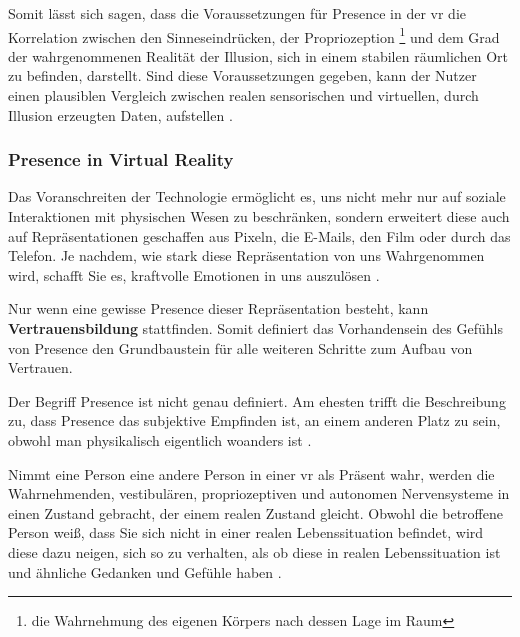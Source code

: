 \documentclass[a4paper,11pt]{article}%
\renewcommand{\\}{\vspace*{0.5\baselineskip} \newline}
\begin{document}
Somit lässt sich sagen, dass die Voraussetzungen für \dq Presence\dq{} in der \ac{vr} die Korrelation zwischen den Sinneseindrücken, der Propriozeption \footnote{die Wahrnehmung des eigenen Körpers nach dessen Lage im Raum} und dem Grad der wahrgenommenen Realität der Illusion, sich in einem stabilen räumlichen Ort zu befinden, darstellt. Sind diese Voraussetzungen gegeben, kann der Nutzer einen plausiblen Vergleich zwischen realen sensorischen und virtuellen, durch Illusion erzeugten Daten, aufstellen \citep{slater2009we}.

		\subsubsection{Presence in Virtual Reality}
			
	Das Voranschreiten der Technologie ermöglicht es, uns nicht mehr nur auf soziale Interaktionen mit physischen Wesen zu beschränken, sondern erweitert diese auch auf Repräsentationen geschaffen aus Pixeln, die E-Mails, den Film oder durch das Telefon. Je nachdem, wie stark diese Repräsentation von uns Wahrgenommen wird, schafft Sie es, kraftvolle Emotionen in uns auszulösen \citep[p. 4-6]{biocca2002defining}.
	
Nur wenn eine gewisse \dq{}Presence\dq{} dieser Repräsentation besteht, kann \textbf{Vertrauensbildung} stattfinden. Somit definiert das Vorhandensein des Gefühls von \dq Presence \dq{} den Grundbaustein für alle weiteren Schritte zum Aufbau von Vertrauen.

Der Begriff \dq{}Presence\dq{} ist nicht genau definiert. Am ehesten trifft die Beschreibung zu, dass \dq{}Presence\dq{} das subjektive Empfinden ist, an einem anderen Platz zu sein, obwohl man physikalisch eigentlich woanders ist \citep[p. 1]{witmer1998measuring}.

	Nimmt eine Person eine andere Person in einer \ac{vr} als Präsent wahr, werden die Wahrnehmenden, vestibulären, propriozeptiven und autonomen Nervensysteme in einen Zustand gebracht, der einem realen Zustand gleicht. Obwohl die betroffene Person weiß, dass Sie sich nicht in einer realen Lebenssituation befindet, wird diese dazu neigen, sich so zu verhalten, als ob diese in realen Lebenssituation ist und ähnliche Gedanken und Gefühle haben \citep{slater2003note}.
\end{document}
